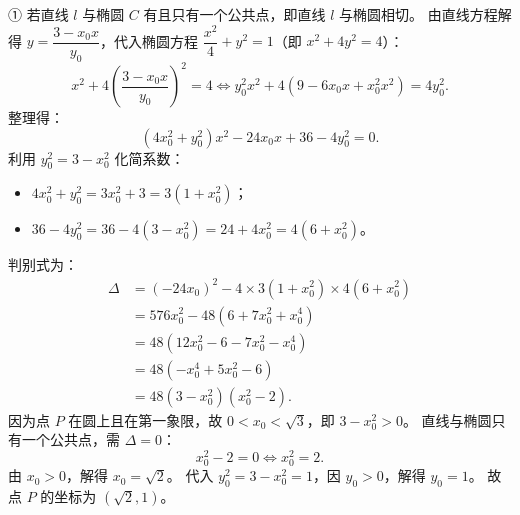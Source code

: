 \begin{answer}
① 若直线 $l$ 与椭圆 $C$ 有且只有一个公共点，即直线 $l$ 与椭圆相切。
由直线方程解得 $y = \dfrac{3 - x_0 x}{y_0}$，代入椭圆方程 $\dfrac{x^2}{4} + y^2 = 1$（即 $x^2 + 4y^2 = 4$）：
\nopagebreak[4]
\[x^2 + 4\left(\frac{3 - x_0 x}{y_0}\right)^2 = 4 \iff y_0^2 x^2 + 4(9 - 6x_0 x + x_0^2 x^2) = 4y_0^2.\]
整理得：
\nopagebreak[4]
\[(4x_0^2 + y_0^2)x^2 - 24x_0 x + 36 - 4y_0^2 = 0.\]
利用 $y_0^2 = 3 - x_0^2$ 化简系数：
\begin{itemize}
\item $4x_0^2 + y_0^2 = 3x_0^2 + 3 = 3(1 + x_0^2)$；
\item $36 - 4y_0^2 = 36 - 4(3 - x_0^2) = 24 + 4x_0^2 = 4(6 + x_0^2)$。
\end{itemize}
判别式为：
\nopagebreak[4]
\[\begin{aligned}
\Delta &= (-24x_0)^2 - 4 \times 3(1 + x_0^2) \times 4(6 + x_0^2) \\
&= 576x_0^2 - 48(6 + 7x_0^2 + x_0^4) \\
&= 48\left(12x_0^2 - 6 - 7x_0^2 - x_0^4\right) \\
&= 48(-x_0^4 + 5x_0^2 - 6) \\
&= 48(3 - x_0^2)(x_0^2 - 2).
\end{aligned}\]
因为点 $P$ 在圆上且在第一象限，故 $0 < x_0 < \sqrt{3}$，即 $3 - x_0^2 > 0$。
直线与椭圆只有一个公共点，需 $\Delta = 0$：
\nopagebreak[4]
\[x_0^2 - 2 = 0 \iff x_0^2 = 2.\]
由 $x_0 > 0$，解得 $x_0 = \sqrt{2}$。
代入 $y_0^2 = 3 - x_0^2 = 1$，因 $y_0 > 0$，解得 $y_0 = 1$。
故点 $P$ 的坐标为 $(\sqrt{2}, 1)$。


\end{answer}
